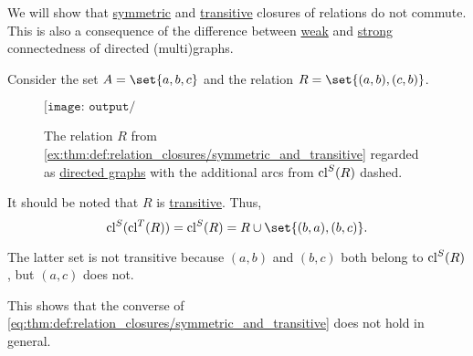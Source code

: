 \begin{example}\label{ex:thm:def:relation_closures/symmetric_and_transitive}
  We will show that \hyperref[def:relation_closures/symmetric]{symmetric} and \hyperref[def:relation_closures/transitive]{transitive} closures of relations do not commute. This is also a consequence of the difference between \hyperref[def:graph_connectedness/weak]{weak} and \hyperref[def:graph_connectedness/strong]{strong} connectedness of directed (multi)graphs.

  Consider the set \( A = \set{ a, b, c } \) and the relation \( R = \set{ (a, b), (c, b) } \).

  \begin{figure}[!ht]
    \begin{equation*}
      \texttt{[image: output/ex\_\_thm\_\_def\_\_relation\_closures\_\_symmetric\_and\_transitive]}
    \end{equation*}
    \caption{The relation \( R \) from \cref{ex:thm:def:relation_closures/symmetric_and_transitive} regarded as \hyperref[def:directed_graph]{directed graphs} with the additional arcs from \( \operatorname{cl}^S(R) \) dashed.}\label{fig:ex:thm:def:relation_closures/symmetric_and_transitive}
  \end{figure}

  It should be noted that \( R \) is \hyperref[def:binary_relation/transitive]{transitive}. Thus,
  \begin{equation*}
    \cl^S(\cl^T(R)) = \cl^S(R) = R \cup \set{ (b, a), (b, c) }.
  \end{equation*}

  The latter set is not transitive because \( (a, b) \) and \( (b, c) \) both belong to \( \operatorname{cl}^S(R) \), but \( (a, c) \) does not.

  This shows that the converse of \eqref{eq:thm:def:relation_closures/symmetric_and_transitive} does not hold in general.
\end{example}

